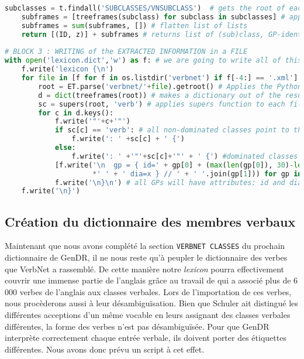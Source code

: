 \begin{lstlisting}[language=Python, caption = Importation de l'architecture des classes verbales, label=fig:archivn]
    subclasses = t.findall('SUBCLASSES/VNSUBCLASS')  # gets the root of each subclasses
    subframes = [treeframes(subclass) for subclass in subclasses] # applies function to subclasses
    subframes = sum(subframes, []) # flatten list of lists
    return [(ID, z)] + subframes # returns list of (sub)class, GP-identification and example
		
# BLOCK 3 : WRITING of the EXTRACTED INFORMATION in a FILE
with open('lexicon.dict','w') as f: # we are going to write all of this block into lexicon.dict
    f.write('lexicon {\n')
    for file in [f for f in os.listdir('verbnet') if f[-4:] == '.xml']: # open VerbNet XMl files
        root = ET.parse('verbnet/'+file).getroot() # Applies the Python Element Tree module
        d = dict(treeframes(root)) # makes a dictionary out of the results of treeframes on a file
        sc = supers(root, 'verb') # applies supers function to each file
        for c in d.keys():
            f.write('"'+c+'"')
            if sc[c] == 'verb': # all non-dominated classes point to the default verb class
                f.write(': ' +sc[c] + ' {') 
            else:
                f.write(': ' +'"'+sc[c]+'"' + ' {') #dominated classes point towards their governor
            [f.write('\n  gp = { id=' + gp[0] + (max(len(gp[0]), 30)-len(gp[0]))
                     *' ' + ' dia=x } // ' + ' '.join(gp[1])) for gp in d[c]]
            f.write('\n}\n') # all GPs will have attributes: id and dia
    f.write('\n}')
\end{lstlisting}

\subsection{Création du dictionnaire des membres verbaux} \label{extracmembre}

Maintenant que nous avons complété la section \texttt{VERBNET CLASSES} du prochain dictionnaire de GenDR, il ne nous reste qu'à peupler le dictionnaire des verbes que VerbNet a rassemblé. De cette manière notre \emph{lexicon} pourra effectivement couvrir une immense partie de l'anglais grâce au travail de \cite{SchulerVerbnetBroadcoverageComprehensive2005} qui a associé plus de 6\,000 verbes de l'anglais aux classes verbales. Lors de l'importation de ces verbes, nous procèderons aussi à leur désambiguïsation. Bien que Schuler ait distingué les différentes acceptions d'un même vocable en leurs assignant des classes verbales différentes, la forme des verbes n'est pas désambiguïsée. Pour que GenDR interprète correctement chaque entrée verbale, ils doivent porter des étiquettes différentes. Nous avons donc prévu un script à cet effet.

